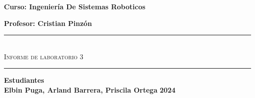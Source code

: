 \begin{titlepage}
\begin{center}
        {\Large \textbf{Curso: Ingeniería De Sistemas Roboticos }}\medskip
        
        {\Large \textbf{Profesor: Cristian Pinzón}}

        \rule{\linewidth}{0.75mm}\\

            {\Large \textsc{Informe de laboratorio 3}} 
        \rule{\linewidth}{0.75mm}\medskip

        {\Large \textbf{Estudiantes}}\\
        \vspace{5mm}
        {\Large \textbf{Elbin Puga, Arland Barrera, Priscila Ortega}}
        \vfill
        {\Huge \textbf{2024}}

    \end{center}
\end{titlepage}